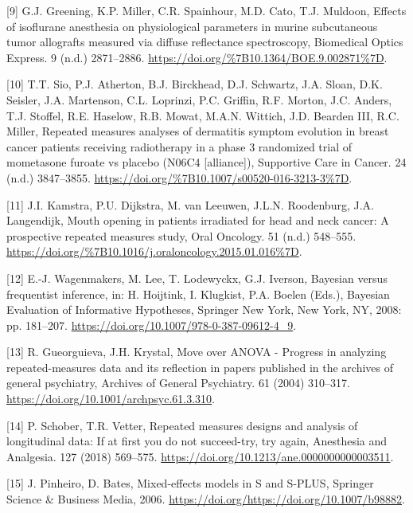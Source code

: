 \documentclass[
]{article}
\begin{document}
\leavevmode\hypertarget{ref-greening2018}{}%
{[}9{]} G.J. Greening, K.P. Miller, C.R. Spainhour, M.D. Cato, T.J. Muldoon, Effects of isoflurane anesthesia on physiological parameters in murine subcutaneous tumor allografts measured via diffuse reflectance spectroscopy, Biomedical Optics Express. 9 (n.d.) 2871--2886. \url{https://doi.org/\%7B10.1364/BOE.9.002871\%7D}.

\leavevmode\hypertarget{ref-sio2016}{}%
{[}10{]} T.T. Sio, P.J. Atherton, B.J. Birckhead, D.J. Schwartz, J.A. Sloan, D.K. Seisler, J.A. Martenson, C.L. Loprinzi, P.C. Griffin, R.F. Morton, J.C. Anders, T.J. Stoffel, R.E. Haselow, R.B. Mowat, M.A.N. Wittich, J.D. Bearden III, R.C. Miller, Repeated measures analyses of dermatitis symptom evolution in breast cancer patients receiving radiotherapy in a phase 3 randomized trial of mometasone furoate vs placebo (N06C4 {[}alliance{]}), Supportive Care in Cancer. 24 (n.d.) 3847--3855. \url{https://doi.org/\%7B10.1007/s00520-016-3213-3\%7D}.

\leavevmode\hypertarget{ref-kamstra2015}{}%
{[}11{]} J.I. Kamstra, P.U. Dijkstra, M. van Leeuwen, J.L.N. Roodenburg, J.A. Langendijk, Mouth opening in patients irradiated for head and neck cancer: A prospective repeated measures study, Oral Oncology. 51 (n.d.) 548--555. \url{https://doi.org/\%7B10.1016/j.oraloncology.2015.01.016\%7D}.

\leavevmode\hypertarget{ref-wagenmakers2008}{}%
{[}12{]} E.-J. Wagenmakers, M. Lee, T. Lodewyckx, G.J. Iverson, Bayesian versus frequentist inference, in: H. Hoijtink, I. Klugkist, P.A. Boelen (Eds.), Bayesian Evaluation of Informative Hypotheses, Springer New York, New York, NY, 2008: pp. 181--207. \url{https://doi.org/10.1007/978-0-387-09612-4_9}.

\leavevmode\hypertarget{ref-gueorguieva2004}{}%
{[}13{]} R. Gueorguieva, J.H. Krystal, Move over ANOVA - Progress in analyzing repeated-measures data and its reflection in papers published in the archives of general psychiatry, Archives of General Psychiatry. 61 (2004) 310--317. \url{https://doi.org/10.1001/archpsyc.61.3.310}.

\leavevmode\hypertarget{ref-schober2018}{}%
{[}14{]} P. Schober, T.R. Vetter, Repeated measures designs and analysis of longitudinal data: If at first you do not succeed-try, try again, Anesthesia and Analgesia. 127 (2018) 569--575. \url{https://doi.org/10.1213/ane.0000000000003511}.

\leavevmode\hypertarget{ref-pinheiro2006}{}%
{[}15{]} J. Pinheiro, D. Bates, Mixed-effects models in S and S-PLUS, Springer Science \& Business Media, 2006. \url{https://doi.org/https://doi.org/10.1007/b98882}.
\end{document}
